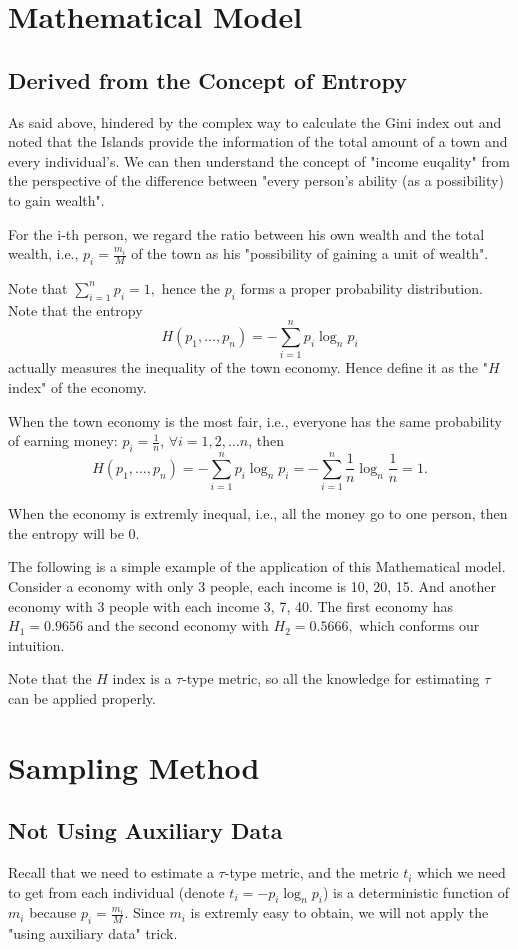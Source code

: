 \documentclass[12pt]{article}%
\begin{document}
\section{Mathematical Model}

\subsection{Derived from the Concept of Entropy}

As said above, hindered by the complex way to calculate the Gini index out and noted that the Islands provide the information of the total amount of a town and every individual's. 
We can then understand the concept of "income euqality" from the perspective of the difference between "every person's ability (as a possibility) to gain wealth".

For the i-th person, we regard the ratio between his own wealth and the total wealth, i.e., $p_i=\frac{m_i}{M}$ of the town as his "possibility of gaining a unit of wealth".

Note that $\sum_{i=1}^{n}p_i=1,$ hence the $p_i$ forms a proper probability distribution. Note that the entropy $$H(p_1,\dots,p_n)=-\sum_{i=1}^{n}p_i\log_{n}{p_i}$$ actually measures the 
inequality of the town economy. Hence define it as the "$H$ index" of the economy.

When the town economy is the most fair, i.e., everyone has the same probability of earning money: $p_i=\frac{1}{n}$, $\forall i=1,2,\dots n$, then $$H(p_1,\dots, p_n)=-\sum_{i=1}^{n}p_i\log_{n}{p_i}=-\sum_{i=1}^{n}\frac{1}{n}\log_{n}{\frac{1}{n}}=1.$$ 

When the economy is extremly inequal, i.e., all the money go to one person, then the entropy will be 0.

The following is a simple example of the application of this Mathematical model. Consider a economy with only 3 people, each income is 10, 20, 15. 
And another economy with 3 people with each income  3, 7, 40. The first economy has $H_1=0.9656$ and the second economy with $H_2=0.5666,$ which conforms our intuition.


Note that the $H$ index is a $\tau$-type metric, so all the knowledge for estimating $\tau$ can be applied properly.


\section{Sampling Method}

\subsection{Not Using Auxiliary Data}
Recall that we need to estimate a $\tau$-type metric, and the metric $t_i$ which we need to get from each individual (denote $t_i=-p_i\log_{n}{p_i}$) is a deterministic function of $m_i$ because $p_i=\frac{m_i}{M}$.
Since $m_i$ is extremly easy to obtain, we will not apply the "using auxiliary data" trick.
\end{document}
